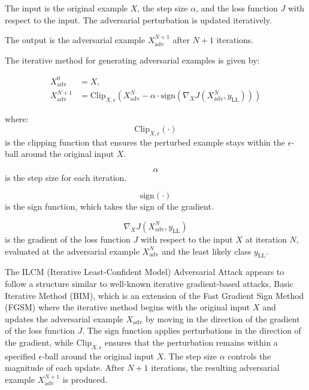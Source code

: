 The input is the original example $X$, the step size $\alpha$, and the loss function $J$ with respect to the input. The adversarial perturbation is updated iteratively.

The output is the adversarial example $X_{\text{adv}}^{N+1}$ after $N+1$ iterations.

The iterative method for generating adversarial examples is given by:

\begin{align}
X_{\text{adv}}^0 &= X, \\
X_{\text{adv}}^{N+1} &= \text{Clip}_{X,\epsilon} \left( X_{\text{adv}}^N - \alpha \cdot \text{sign} \left( \nabla_X J(X_{\text{adv}}^N, y_{\text{LL}}) \right) \right)
\end{align}

where:
\begin{equation*}
\text{Clip}_{X,\epsilon}(\cdot)
\end{equation*}
is the clipping function that ensures the perturbed example stays within the $\epsilon$-ball around the original input $X$.

\begin{equation*}
\alpha
\end{equation*}
is the step size for each iteration.

\begin{equation*}
\text{sign}(\cdot)
\end{equation*}
is the sign function, which takes the sign of the gradient.

\begin{equation*}
\nabla_X J(X_{\text{adv}}^N, y_{\text{LL}})
\end{equation*}
is the gradient of the loss function $J$ with respect to the input $X$ at iteration $N$, evaluated at the adversarial example $X_{\text{adv}}^N$ and the least likely class $y_{\text{LL}}$.

The ILCM (Iterative Least-Confident Model) Adversarial Attack appears to follow a structure similar to well-known iterative gradient-based attacks, Basic Iterative Method (BIM), which is an extension of the Fast Gradient Sign Method (FGSM) where the iterative method begins with the original input $X$ and updates the adversarial example $X_{\text{adv}}$ by moving in the direction of the gradient of the loss function $J$. The $\text{sign}$ function applies perturbations in the direction of the gradient, while $\text{Clip}_{X,\epsilon}$ ensures that the perturbation remains within a specified $\epsilon$-ball around the original input $X$. The step size $\alpha$ controls the magnitude of each update. After $N+1$ iterations, the resulting adversarial example $X_{\text{adv}}^{N+1}$ is produced.
